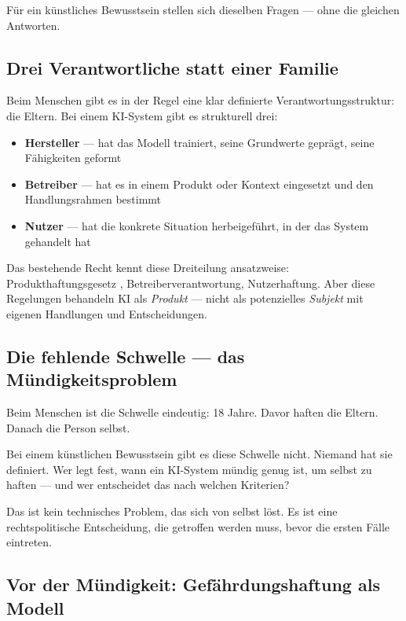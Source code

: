 \documentclass[acmcp, nonacm]{acmart}
\begin{document}
Für ein künstliches Bewusstsein stellen sich dieselben Fragen --- ohne die gleichen Antworten.

\subsection{Drei Verantwortliche statt einer Familie}

Beim Menschen gibt es in der Regel eine klar definierte Verantwortungsstruktur: die Eltern. Bei einem KI-System gibt es strukturell drei:

\begin{itemize}
\item \textbf{Hersteller} --- hat das Modell trainiert, seine Grundwerte geprägt, seine Fähigkeiten geformt
\item \textbf{Betreiber} --- hat es in einem Produkt oder Kontext eingesetzt und den Handlungsrahmen bestimmt
\item \textbf{Nutzer} --- hat die konkrete Situation herbeigeführt, in der das System gehandelt hat
\end{itemize}

Das bestehende Recht kennt diese Dreiteilung ansatzweise: Produkthaftungsgesetz \cite{ProdHaftG1989}, Betreiberverantwortung, Nutzerhaftung. Aber diese Regelungen behandeln KI als \emph{Produkt} --- nicht als potenzielles \emph{Subjekt} mit eigenen Handlungen und Entscheidungen.

\subsection{Die fehlende Schwelle --- das Mündigkeitsproblem}

Beim Menschen ist die Schwelle eindeutig: 18 Jahre. Davor haften die Eltern. Danach die Person selbst.

Bei einem künstlichen Bewusstsein gibt es diese Schwelle nicht. Niemand hat sie definiert. Wer legt fest, wann ein KI-System mündig genug ist, um selbst zu haften --- und wer entscheidet das nach welchen Kriterien?

Das ist kein technisches Problem, das sich von selbst löst. Es ist eine rechtspolitische Entscheidung, die getroffen werden muss, bevor die ersten Fälle eintreten.

\subsection{Vor der Mündigkeit: Gefährdungshaftung als Modell}
\end{document}

